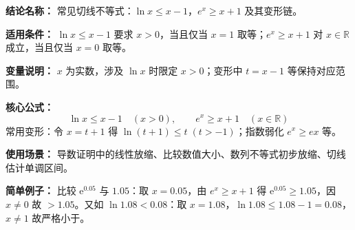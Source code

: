 \textbf{结论名称：} 常见切线不等式：$\ln x\le x-1$，$e^x\ge x+1$ 及其变形链。

\textbf{适用条件：} $\ln x\le x-1$ 要求 $x>0$，当且仅当 $x=1$ 取等；$e^x\ge x+1$ 对 $x\in\mathbb{R}$ 成立，当且仅当 $x=0$ 取等。

\textbf{变量说明：} $x$ 为实数，涉及 $\ln x$ 时限定 $x>0$；变形中 $t=x-1$ 等保持对应范围。

\textbf{核心公式：}
\[
\boxed{\ln x \le x-1\quad (x>0)},\qquad \boxed{e^x \ge x+1\quad (x\in\mathbb{R})}
\]
常用变形：令 $x=t+1$ 得 $\ln(t+1)\le t\;(t>-1)$；指数弱化 $e^x\ge ex$ 等。

\textbf{使用场景：} 导数证明中的线性放缩、比较数值大小、数列不等式初步放缩、切线估计单调区间。

\textbf{简单例子：} 比较 $\mathrm{e}^{0.05}$ 与 $1.05$：取 $x=0.05$，由 $e^x\ge x+1$ 得 $\mathrm{e}^{0.05}\ge 1.05$，因 $x\neq0$ 故 $>1.05$。又如 $\ln 1.08<0.08$：取 $x=1.08$，$\ln 1.08\le 1.08-1=0.08$，$x\neq1$ 故严格小于。
